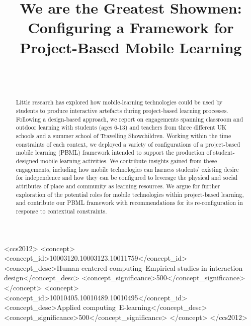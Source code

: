 \documentclass[,hyphens]{sigchi}
\begin{document}
\title{We are the Greatest Showmen: Configuring a Framework for Project-Based Mobile Learning}

\author{%
  \\
  \\
}

\maketitle

\begin{abstract}
Little research has explored how mobile-learning technologies could be used by students to produce interactive artefacts during project-based learning processes. Following a design-based approach, we report on engagements spanning classroom and outdoor learning with students (ages 6-13) and teachers from three different UK schools and a summer school of Travelling Showchildren. Working within the time constraints of each context, we deployed a variety of configurations of a project-based mobile learning (PBML) framework intended to support the production of student-designed mobile-learning activities. We contribute insights gained from these engagements, including how mobile technologies can harness students' existing desire for independence and how they can be configured to leverage the physical and social attributes of place and community as learning resources. We argue for further exploration of the potential roles for mobile technologies within project-based learning, and contribute our PBML framework with recommendations for its re-configuration in response to contextual constraints.
\end{abstract}



\begin{CCSXML}
<ccs2012>
<concept>
<concept_id>10003120.10003123.10011759</concept_id>
<concept_desc>Human-centered computing~Empirical studies in interaction design</concept_desc>
<concept_significance>500</concept_significance>
</concept>
<concept>
<concept_id>10010405.10010489.10010495</concept_id>
<concept_desc>Applied computing~E-learning</concept_desc>
<concept_significance>500</concept_significance>
</concept>
</ccs2012>
\end{CCSXML}
\end{document}
